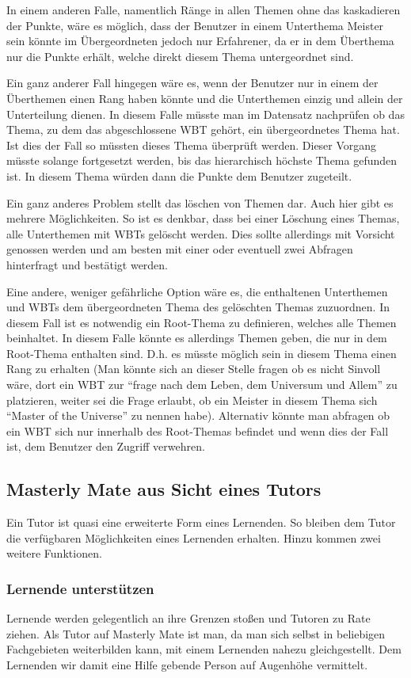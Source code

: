 In einem anderen Falle, namentlich Ränge in allen Themen ohne das kaskadieren
der Punkte, wäre es möglich, dass der Benutzer in einem Unterthema Meister sein
könnte im Übergeordneten jedoch nur Erfahrener, da er in dem Überthema nur die
Punkte erhält, welche direkt diesem Thema untergeordnet sind.

Ein ganz anderer Fall hingegen wäre es, wenn der Benutzer nur in einem der
Überthemen einen Rang haben könnte und die Unterthemen einzig und allein der
Unterteilung dienen. In diesem Falle müsste man im Datensatz nachprüfen ob das
Thema, zu dem das abgeschlossene WBT gehört, ein übergeordnetes Thema hat. Ist
dies der Fall so müssten dieses Thema überprüft werden. Dieser Vorgang müsste
solange fortgesetzt werden, bis das hierarchisch höchste Thema gefunden ist.
In diesem Thema würden dann die Punkte dem Benutzer zugeteilt.

Ein ganz anderes Problem stellt das löschen von Themen dar. Auch hier gibt es
mehrere Möglichkeiten. So ist es denkbar, dass bei einer Löschung eines Themas,
alle Unterthemen mit WBTs gelöscht werden. Dies sollte allerdings mit Vorsicht
genossen werden und am besten mit einer oder eventuell zwei Abfragen hinterfragt
und bestätigt werden.

Eine andere, weniger gefährliche Option wäre es, die enthaltenen Unterthemen und
WBTs dem übergeordneten Thema des gelöschten Themas zuzuordnen. In diesem Fall
ist es notwendig ein Root-Thema zu definieren, welches alle Themen beinhaltet.
In diesem Falle könnte es allerdings Themen geben, die nur in dem Root-Thema
enthalten sind. D.h. es müsste möglich sein in diesem Thema einen Rang
zu erhalten (Man könnte sich an dieser Stelle fragen ob es nicht Sinvoll wäre,
dort ein WBT zur "`frage nach dem Leben, dem Universum und Allem"' zu
platzieren, weiter sei die Frage erlaubt, ob ein Meister in diesem Thema sich
``Master of the Universe'' zu nennen habe). Alternativ könnte man abfragen ob
ein WBT sich nur innerhalb des Root-Themas befindet und wenn dies der Fall ist,
dem Benutzer den Zugriff verwehren.  

\subsection{Masterly Mate aus Sicht eines Tutors}
Ein Tutor ist quasi eine erweiterte Form eines Lernenden. So bleiben dem Tutor
die verfügbaren Möglichkeiten eines Lernenden erhalten. Hinzu kommen zwei
weitere Funktionen.

\subsubsection{Lernende unterstützen}
Lernende werden gelegentlich an ihre Grenzen stoßen und Tutoren zu Rate ziehen.
Als Tutor auf Masterly Mate ist man, da man sich selbst in beliebigen
Fachgebieten weiterbilden kann, mit einem Lernenden nahezu gleichgestellt. Dem
Lernenden wir damit eine Hilfe gebende Person auf Augenhöhe vermittelt. 

